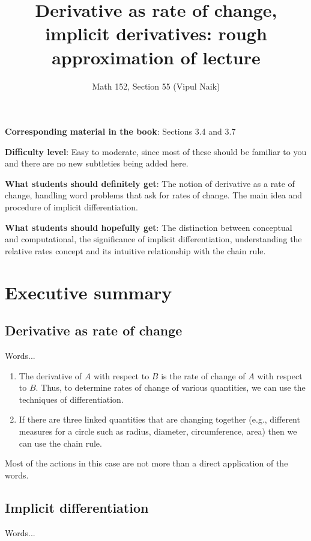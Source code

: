 \documentclass[10pt]{amsart}
\title{Derivative as rate of change, implicit derivatives: rough approximation of lecture}
\author{Math 152, Section 55 (Vipul Naik)}
\begin{document}
\maketitle

{\bf Corresponding material in the book}: Sections 3.4 and 3.7

{\bf Difficulty level}: Easy to moderate, since most of these should
be familiar to you and there are no new subtleties being added here.

{\bf What students should definitely get}: The notion of derivative as
a rate of change, handling word problems that ask for rates of
change. The main idea and procedure of implicit differentiation.

{\bf What students should hopefully get}: The distinction between
conceptual and computational, the significance of implicit
differentiation, understanding the relative rates concept and its
intuitive relationship with the chain rule.

\section*{Executive summary}

\subsection*{Derivative as rate of change}

Words...

\begin{enumerate}
\item The derivative of $A$ with respect to $B$ is the rate of change
  of $A$ with respect to $B$. Thus, to determine rates of change of
  various quantities, we can use the techniques of differentiation.
\item If there are three linked quantities that are changing together
  (e.g., different measures for a circle such as radius, diameter,
  circumference, area) then we can use the chain rule.
\end{enumerate}

Most of the actions in this case are not more than a direct
application of the words.

\subsection*{Implicit differentiation}

Words...
\end{document}

